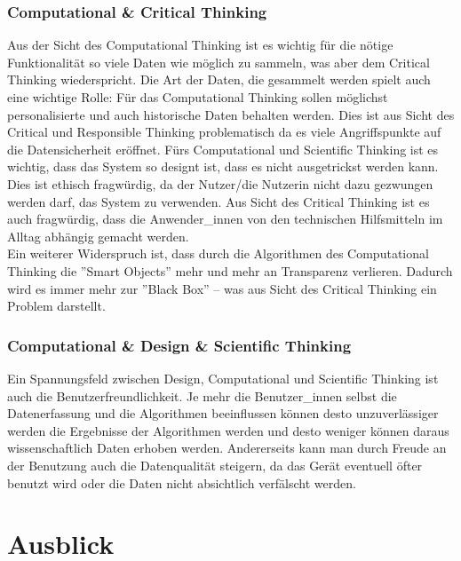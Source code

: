 \documentclass[sigchi-a, authorversion]{acmart}
\begin{document}
\subsubsection{\textbf{Computational \& Critical Thinking}}
Aus der Sicht des Computational Thinking ist es wichtig für die nötige Funktionalität so viele Daten wie möglich zu sammeln, was aber dem Critical Thinking wiederspricht. Die Art der Daten, die gesammelt werden spielt auch eine wichtige Rolle: Für das Computational Thinking sollen möglichst personalisierte und auch historische Daten behalten werden. Dies ist aus Sicht des Critical und Responsible Thinking problematisch da es viele Angriffspunkte auf die Datensicherheit eröffnet. Fürs Computational und Scientific Thinking ist es wichtig, dass das System so designt ist, dass es nicht ausgetrickst werden kann. Dies ist ethisch fragwürdig, da der Nutzer/die Nutzerin nicht dazu gezwungen werden darf, das System zu verwenden. Aus Sicht des Critical Thinking ist es auch fragwürdig, dass die Anwender\_innen von den technischen Hilfsmitteln im Alltag abhängig gemacht werden.\\

Ein weiterer Widerspruch ist, dass durch die Algorithmen des Computational Thinking die ''Smart Objects'' mehr und mehr an Transparenz verlieren. Dadurch wird es immer mehr zur ''Black Box'' – was aus Sicht des Critical Thinking ein Problem darstellt.
\subsubsection{\textbf{Computational \& Design \& Scientific Thinking}}
Ein Spannungsfeld zwischen Design, Computational und Scientific Thinking ist auch die Benutzerfreundlichkeit. Je mehr die Benutzer\_innen selbst die Datenerfassung und die Algorithmen beeinflussen können desto unzuverlässiger werden die Ergebnisse der Algorithmen werden und desto weniger können daraus wissenschaftlich Daten erhoben werden. Andererseits kann man durch Freude an der Benutzung auch die Datenqualität steigern, da das Gerät eventuell öfter benutzt wird oder die Daten nicht absichtlich verfälscht werden.
\section{Ausblick}
\end{document}
